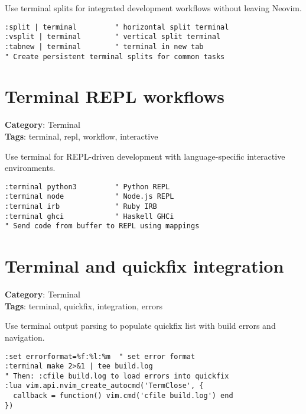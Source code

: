 {{{{{{{{{{Use terminal splits for integrated development workflows without leaving Neovim.

\begin{Exa*}{}
\begin{Verbatim}[fontsize=\footnotesize, breaklines, breakanywhere]
:split | terminal         " horizontal split terminal
:vsplit | terminal        " vertical split terminal  
:tabnew | terminal        " terminal in new tab
" Create persistent terminal splits for common tasks
\end{Verbatim}
\end{Exa*}

\section{Terminal REPL workflows}

\textbf{Category}: Terminal\\ \textbf{Tags}: terminal, repl, workflow, interactive
\vspace{0.5cm}

Use terminal for REPL-driven development with language-specific interactive environments.

\begin{Exa*}{}
\begin{Verbatim}[fontsize=\footnotesize, breaklines, breakanywhere]
:terminal python3         " Python REPL
:terminal node            " Node.js REPL
:terminal irb             " Ruby IRB  
:terminal ghci            " Haskell GHCi
" Send code from buffer to REPL using mappings
\end{Verbatim}
\end{Exa*}

\section{Terminal and quickfix integration}

\textbf{Category}: Terminal\\ \textbf{Tags}: terminal, quickfix, integration, errors
\vspace{0.5cm}

Use terminal output parsing to populate quickfix list with build errors and navigation.

\begin{Exa*}{}
\begin{Verbatim}[fontsize=\footnotesize, breaklines, breakanywhere]
:set errorformat=%f:%l:%m  " set error format
:terminal make 2>&1 | tee build.log
" Then: :cfile build.log to load errors into quickfix
:lua vim.api.nvim_create_autocmd('TermClose', {
  callback = function() vim.cmd('cfile build.log') end
})
\end{Verbatim}
\end{Exa*}

}}}}}}}}}}
